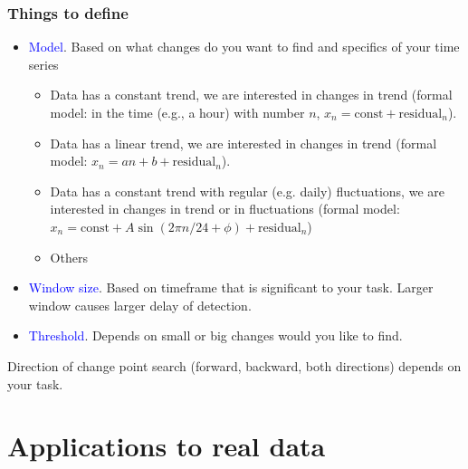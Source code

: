 \documentclass[intlimits, 9pt, unicode]{beamer}
\newcommand{\textblue}[1]{\textcolor{blue}{#1}}
\begin{document}
\begin{frame}
    \frametitle{Things to define}
	
	\begin{itemize}
	    	\item \textblue{Model}. Based on what changes do you want to find and specifics of your time series
			\begin{itemize}
			\item Data has a constant trend, we are interested in changes in trend (formal model: in the time (e.g., a hour) with number $n$, $x_n = \mathrm{const} + \mathrm{residual}_n$).
\smallskip
			\item Data has a linear trend, we are interested in changes in trend (formal model: $x_n = an+b + \mathrm{residual}_n$).
\smallskip
			\item Data has a constant trend with regular (e.g. daily) fluctuations, we are interested in changes in trend or in fluctuations (formal model: $x_n = \mathrm{const} + A\sin(2\pi n/24+\phi) + \mathrm{residual}_n$)
\smallskip			
            \item Others
			\end{itemize}
\medskip
		\item \textblue{Window size}. Based on timeframe that is significant to your task. Larger window causes larger delay of detection.
\medskip
		\item \textblue{Threshold}. Depends on small or big changes would you like to find.
	    \end{itemize}

\bigskip
		Direction of change point search (forward, backward, both directions) depends on your task.


 \end{frame}

\section{Applications to real data}
\end{document}
